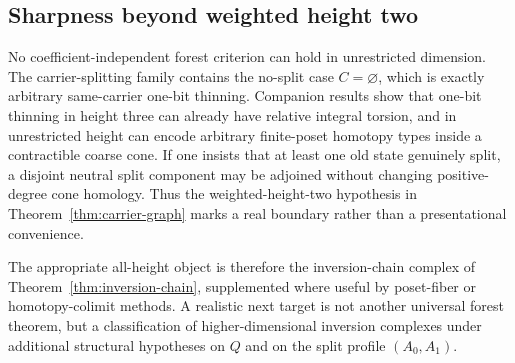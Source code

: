 \subsection{Sharpness beyond weighted height two}

No coefficient-independent forest criterion can hold in unrestricted dimension.
The carrier-splitting family contains the no-split case $C=\varnothing$, which is
exactly arbitrary same-carrier one-bit thinning.  Companion results show that one-bit
thinning in height three can already have relative integral torsion, and in unrestricted
height can encode arbitrary finite-poset homotopy types inside a contractible coarse
cone.  If one insists that at least one old state genuinely split, a disjoint neutral
split component may be adjoined without changing positive-degree cone homology.
Thus the weighted-height-two hypothesis in Theorem~\ref{thm:carrier-graph} marks a
real boundary rather than a presentational convenience.

The appropriate all-height object is therefore the inversion-chain complex of
Theorem~\ref{thm:inversion-chain}, supplemented where useful by poset-fiber or
homotopy-colimit methods.  A realistic next target is not another universal forest
theorem, but a classification of higher-dimensional inversion complexes under
additional structural hypotheses on $Q$ and on the split profile $(A_0,A_1)$.
